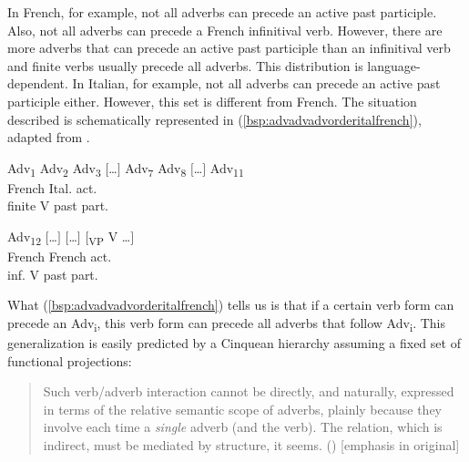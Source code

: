 \largerpage
In French, for example, not all adverbs can precede an active past participle. Also, not all adverbs can precede a French infinitival verb. However, there are more adverbs that can precede an active past participle than an infinitival verb and finite verbs usually precede all adverbs. This distribution is language-dependent. In Italian, for example, not all adverbs can precede an active past participle either. However, this set is different from French. The situation described is schematically represented in (\ref{bsp:advadvadvorderitalfrench}), adapted from \citet[686]{cinque2004issues}.


\begin{exe}
\ex\label{bsp:advadvadvorderitalfrench} 
\glll {\hspace*{3ex}\textbullet} {Adv\textsubscript{1}} {Adv\textsubscript{2}} {Adv\textsubscript{3}} {$[$\dots$]$} {Adv\textsubscript{7}} {\hspace*{4ex}\textbullet } {Adv\textsubscript{8}} {$[$\dots$]$} {Adv\textsubscript{11}}\\
{\hspace*{0.5ex}French} {} {} {} {} {} {\hspace*{0.5ex}Ital. act.} {} {} {} \\ 
{\hspace*{0.2ex}finite V} {} {} {} {} {} {past part.} {} {} {} \\ \medskip\par
\glll {\hspace*{3ex}\textbullet } {Adv\textsubscript{12}} {$[$\dots$]$} {\hspace*{5ex}\textbullet } {$[$\dots$]$} {$[$\textsubscript{VP} V \dots$]$} \\
{\hspace*{0.5ex}French} {} {} {\hspace*{0.5ex}French act.} {} {}\\
{\hspace*{1ex}inf. V} {} {} {\hspace*{1.8ex}past part.} {} {}\\
\end{exe}

\noindent What (\ref{bsp:advadvadvorderitalfrench}) tells us is that if a certain verb form can precede an Adv\textsubscript{i}, this verb form can precede all adverbs that follow Adv\textsubscript{i}. This generalization is easily predicted by a Cinquean hierarchy assuming a fixed set of functional projections:

\begin{quote}
Such verb/adverb interaction cannot be directly, and naturally, expressed in terms of the relative semantic scope of adverbs, plainly because they involve each time a \textit{single} adverb (and the verb). The relation, which is indirect, must be mediated by structure, it seems. (\citealt[686]{cinque2004issues}) [emphasis in original]
\end{quote}

